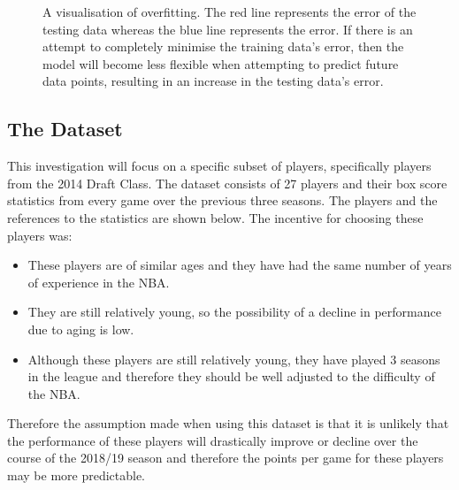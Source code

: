 \documentclass[a4paper,11pt,twoside]{article}
\begin{document}
      \begin{figure}[!htb]
      \captionsetup{justification=centering}
        \caption{\label{fig:my-label} A visualisation of overfitting. The red line represents the error of the testing data whereas the blue line represents the error. If there is an attempt to completely minimise the training data's error, then the model will become less flexible when attempting to predict future data points, resulting in an increase in the testing data's error. }
      \end{figure}



\subsection{The Dataset}
This investigation will focus on a specific subset of players, specifically players from the 2014 Draft Class. The dataset consists of 27 players and their box score statistics from every game over the previous three seasons. The players and the references to the statistics are shown below. The incentive for choosing these players was:
\begin{itemize}
    \item These players are of similar ages and they have had the same number of years of experience in the NBA.
    \item They are still relatively young, so the possibility of a decline in performance due to aging is low.
    \item Although these players are still relatively young, they have played 3 seasons in the league and therefore they should be well adjusted to the difficulty of the NBA.
\end{itemize}
Therefore the assumption made when using this dataset is that it is unlikely that the performance of these players will drastically improve or decline over the course of the 2018/19 season and therefore the points per game for these players may be more predictable.
\end{document}
